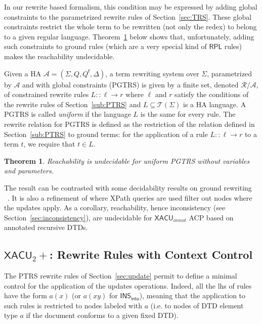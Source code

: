 \documentclass[a4paper]{article}
\theoremstyle{plain}
\newtheorem{theorem}{Theorem}
\newcommand{\R}{\mathcal{R}}
\newcommand{\T}{\mathcal{T}}
\newcommand{\F}{\Sigma}
\newcommand{\A}{\mathcal{A}}
\newcommand{\ptrs}[2]{{#1}{/}{#2}}
\newcommand{\final}{\mathsf{f}}
\newcommand{\XACU}{\textsf{XACU}}
\newcommand{\INS}{\mathsf{INS}}
\newcommand{\RPL}{\mathsf{RPL}}
\begin{document}
In our rewrite based formalism, this condition may be expressed 
by adding global constraints to the parametrized rewrite rules of Section~\ref{sec:TRS}.
These global constraints restrict the whole term to be rewritten 
(not only the redex) to belong to a given regular language.
Theorem~\ref{th:undec} below shows that, unfortunately, 
adding such constraints to ground rules (which are a very special kind of $\RPL$ rules)
makes the reachability undecidable.

Given a HA $\A = (\F, Q, Q^\final, \Delta)$,
a term rewriting system over $\F$, parametrized by $\A$ 
and with global constraints (PGTRS)
is given by a finite set, denoted $\ptrs{\R}{\A}$, of 
constrained rewrite rules 
$L :: \ell \to r $ 
where $\ell$ and $r$ satisfy the conditions of the rewrite rules of 
Section~\ref{sub:PTRS} and $L \subseteq \T(\Sigma)$ is a HA language.
A PGTRS is called \emph{uniform} if the language $L$ is the same for every rule.
The rewrite relation for PGTRS 
is defined as the restriction of the relation defined in Section~\ref{sub:PTRS} to ground terms:
for the application of a rule $L:: \ell \to r $ to a term $t$, 
we require that $t \in L$. 


\begin{theorem} \label{th:undec}
Reachability is undecidable for uniform PGTRS without variables and parameters.
\end{theorem}
The result can be contrasted with some decidability results on ground rewriting ~\cite{Gilleron91}.   
It is also a refinement of \cite{FundulakiManeth07}
where XPath queries are used filter out nodes where the updates apply.
As a corollary, reachability, 
hence inconsistency (see Section~\ref{sec:inconsistency}), 
are undecidable for $\XACU_{annot}$ ACP based on annotated recursive DTDs.







\subsection{$\XACU_2+$: Rewrite Rules with Context Control}
\label{sec:context}

The PTRS rewrite rules of Section~\ref{sec:update}
permit to define a minimal control for the application of the updates operations.
Indeed, all the lhs of rules have the form $a(x)$ 
(or $a(xy)$ for $\INS_{\mathsf{into}}$),
meaning that the application to such rules is restricted to nodes labeled
with $a$ (i.e. to nodes of DTD element type $a$ if the document conforms to a given fixed DTD).
\end{document}
